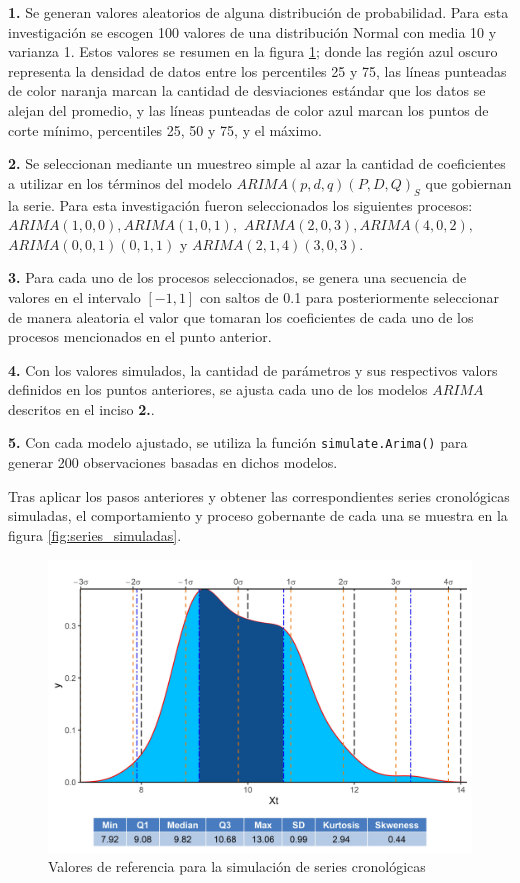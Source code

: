 \documentclass[
]{article}
\begin{document}
\textbf{1.} Se generan valores aleatorios de alguna distribución de
probabilidad. Para esta investigación se escogen 100 valores de una
distribución Normal con media 10 y varianza 1. Estos valores se resumen
en la figura \ref{fig:datos_simulados}; donde las región azul oscuro
representa la densidad de datos entre los percentiles 25 y 75, las
líneas punteadas de color naranja marcan la cantidad de desviaciones
estándar que los datos se alejan del promedio, y las líneas punteadas de
color azul marcan los puntos de corte mínimo, percentiles 25, 50 y 75, y
el máximo.

\textbf{2.} Se seleccionan mediante un muestreo simple al azar la
cantidad de coeficientes a utilizar en los términos del modelo
\(ARIMA(p,d,q)(P,D,Q)_S\) que gobiernan la serie. Para esta
investigación fueron seleccionados los siguientes procesos:
\(ARIMA(1,0,0), ARIMA(1,0,1),\) \(ARIMA(2,0,3), ARIMA(4,0,2),\)
\(ARIMA(0,0,1)(0,1,1)\) y \(ARIMA(2,1,4)(3,0,3)\).

\textbf{3.} Para cada uno de los procesos seleccionados, se genera una
secuencia de valores en el intervalo \([-1,1]\) con saltos de 0.1 para
posteriormente seleccionar de manera aleatoria el valor que tomaran los
coeficientes de cada uno de los procesos mencionados en el punto
anterior.

\textbf{4.} Con los valores simulados, la cantidad de parámetros y sus
respectivos valors definidos en los puntos anteriores, se ajusta cada
uno de los modelos \(ARIMA\) descritos en el inciso \textbf{2.}.

\textbf{5.} Con cada modelo ajustado, se utiliza la función
\texttt{simulate.Arima()} para generar 200 observaciones basadas en
dichos modelos.

Tras aplicar los pasos anteriores y obtener las correspondientes series
cronológicas simuladas, el comportamiento y proceso gobernante de cada
una se muestra en la figura \ref{fig:series_simuladas}.

\begin{figure}[H]
\includegraphics[width=1\linewidth,height=1\textheight]{Tesis_files/figure-latex/datos_simulados-1} \caption{Valores de referencia para la simulación de series cronológicas}\label{fig:datos_simulados}
\end{figure}
\end{document}
